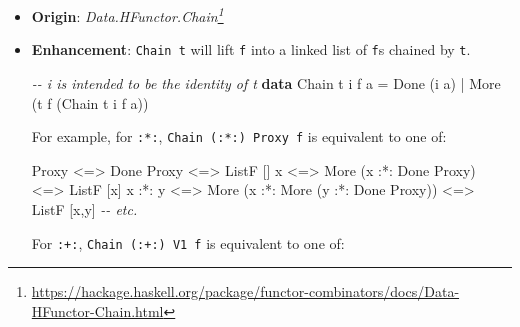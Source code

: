 \documentclass[]{article}
\newenvironment{Shaded}{}{}
\newcommand{\CommentTok}[1]{\textcolor[rgb]{0.38,0.63,0.69}{\textit{#1}}}
\newcommand{\DataTypeTok}[1]{\textcolor[rgb]{0.56,0.13,0.00}{#1}}
\newcommand{\KeywordTok}[1]{\textcolor[rgb]{0.00,0.44,0.13}{\textbf{#1}}}
\newcommand{\NormalTok}[1]{#1}
\newcommand{\OperatorTok}[1]{\textcolor[rgb]{0.40,0.40,0.40}{#1}}
\newcommand{\OtherTok}[1]{\textcolor[rgb]{0.00,0.44,0.13}{#1}}
\renewcommand{\href}[2]{#2\footnote{\url{#1}}}
\begin{document}
\begin{itemize}
\item
  \textbf{Origin}:
  \emph{\href{https://hackage.haskell.org/package/functor-combinators/docs/Data-HFunctor-Chain.html}{Data.HFunctor.Chain}}
\item
  \textbf{Enhancement}: \texttt{Chain\ t} will lift \texttt{f} into a linked
  list of \texttt{f}s chained by \texttt{t}.

\begin{Shaded}
\begin{Highlighting}[]
\CommentTok{{-}{-} i is intended to be the identity of t}
\KeywordTok{data} \DataTypeTok{Chain}\NormalTok{ t i f a }\OtherTok{=} \DataTypeTok{Done}\NormalTok{ (i a)}
                   \OperatorTok{|} \DataTypeTok{More}\NormalTok{ (t f (}\DataTypeTok{Chain}\NormalTok{ t i f a))}
\end{Highlighting}
\end{Shaded}

  For example, for \texttt{:*:}, \texttt{Chain\ (:*:)\ Proxy\ f} is equivalent
  to one of:

\begin{Shaded}
\begin{Highlighting}[]
\DataTypeTok{Proxy}   \OperatorTok{\textless{}=\textgreater{}} \DataTypeTok{Done} \DataTypeTok{Proxy}                           \OperatorTok{\textless{}=\textgreater{}} \DataTypeTok{ListF}\NormalTok{ []}
\NormalTok{x       }\OperatorTok{\textless{}=\textgreater{}} \DataTypeTok{More}\NormalTok{ (x }\OperatorTok{:*:} \DataTypeTok{Done} \DataTypeTok{Proxy}\NormalTok{)              }\OperatorTok{\textless{}=\textgreater{}} \DataTypeTok{ListF}\NormalTok{ [x]}
\NormalTok{x }\OperatorTok{:*:}\NormalTok{ y }\OperatorTok{\textless{}=\textgreater{}} \DataTypeTok{More}\NormalTok{ (x }\OperatorTok{:*:} \DataTypeTok{More}\NormalTok{ (y }\OperatorTok{:*:} \DataTypeTok{Done} \DataTypeTok{Proxy}\NormalTok{)) }\OperatorTok{\textless{}=\textgreater{}} \DataTypeTok{ListF}\NormalTok{ [x,y]}
\CommentTok{{-}{-} etc.}
\end{Highlighting}
\end{Shaded}

  For \texttt{:+:}, \texttt{Chain\ (:+:)\ V1\ f} is equivalent to one of:


\end{itemize}
\end{document}
